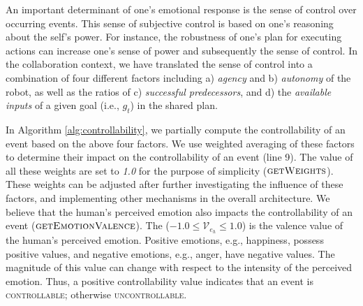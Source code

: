 \documentclass[12pt]{report}
\begin{document}
An important determinant of one's emotional response is the sense of control
over occurring events. This sense of subjective control is based on one's
reasoning about the self's power. For instance, the robustness of one's plan for
executing actions can increase one's sense of power and subsequently the sense
of control. In the collaboration context, we have translated the sense of control
into a combination of four different factors including a) \textit{agency} and b)
\textit{autonomy} of the robot, as well as the ratios of c) \textit{successful
predecessors}, and d) the \textit{available inputs} of a given goal
(i.e., $\mathit{g}_{t}$) in the shared plan.

In Algorithm \ref{alg:controllability}, we partially compute the controllability
of an event based on the above four factors. We use weighted averaging of these
factors to determine their impact on the controllability of an event (line 9).
The value of all these weights are set to \textit{1.0} for the purpose of
simplicity (\textbf{$\Call{getWeights}{}$}). These weights can be adjusted after
further investigating the influence of these factors, and implementing other
mechanisms in the overall architecture. We believe that the human's perceived
emotion also impacts the controllability of an event
(\textbf{$\Call{getEmotionValence}{}$}). The ($-1.0 \leq \mathcal{V}_{e_h} \leq
1.0$) is the valence value of the human's perceived emotion. Positive emotions,
e.g., happiness, possess positive values, and negative emotions, e.g., anger,
have negative values. The magnitude of this value can change with respect to the
intensity of the perceived emotion. Thus, a positive controllability value
indicates that an event is \textsc{controllable}; otherwise
\textsc{uncontrollable}.

% 
\end{document}
